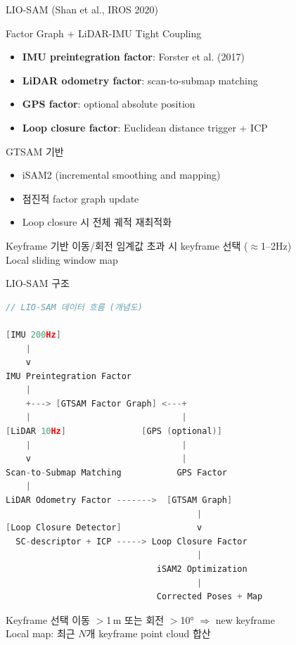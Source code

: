 \begin{frame}[shrink=20]{LIO-SAM (Shan et al., IROS 2020)}
  \begin{block}{Factor Graph + LiDAR-IMU Tight Coupling}
    \begin{itemize}
      \item \textbf{IMU preintegration factor}: Forster et al. (2017)
      \item \textbf{LiDAR odometry factor}: scan-to-submap matching
      \item \textbf{GPS factor}: optional absolute position
      \item \textbf{Loop closure factor}: Euclidean distance trigger + ICP
    \end{itemize}
  \end{block}
  \pause
  \begin{block}{GTSAM 기반}
    \begin{itemize}
      \item iSAM2 (incremental smoothing and mapping)
      \item 점진적 factor graph update
      \item Loop closure 시 전체 궤적 재최적화
    \end{itemize}
  \end{block}
  \pause
  \begin{exampleblock}{Keyframe 기반}
    이동/회전 임계값 초과 시 keyframe 선택 ($\approx$1--2Hz)\\
    Local sliding window map
  \end{exampleblock}
\end{frame}

\begin{frame}[fragile, shrink=20]{LIO-SAM 구조}
\begin{lstlisting}[language=C++,basicstyle=\ttfamily\scriptsize]
// LIO-SAM 데이터 흐름 (개념도)

[IMU 200Hz]
    |
    v
IMU Preintegration Factor
    |
    +---> [GTSAM Factor Graph] <---+
    |                              |
[LiDAR 10Hz]               [GPS (optional)]
    |                              |
    v                              |
Scan-to-Submap Matching           GPS Factor
    |
LiDAR Odometry Factor ------->  [GTSAM Graph]
                                      |
[Loop Closure Detector]               v
  SC-descriptor + ICP -----> Loop Closure Factor
                                      |
                              iSAM2 Optimization
                                      |
                              Corrected Poses + Map
\end{lstlisting}
  \begin{exampleblock}{Keyframe 선택}
    이동 $>$1\,m 또는 회전 $>$10° $\Rightarrow$ new keyframe\\
    Local map: 최근 $N$개 keyframe point cloud 합산
  \end{exampleblock}
\end{frame}

